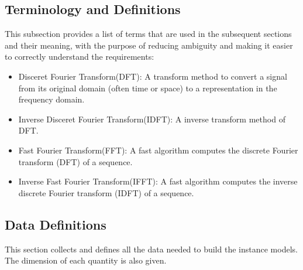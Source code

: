 \documentclass[12pt]{article}
\begin{document}
\subsection{Terminology and  Definitions}

This subsection provides a list of terms that are used in the subsequent
sections and their meaning, with the purpose of reducing ambiguity and making it
easier to correctly understand the requirements:

\begin{itemize}
\item Disceret  Fourier Transform(DFT):  A transform method to convert a signal from its original
  domain (often time or space) to a representation in the frequency domain.
\end{itemize}

\begin{itemize}
\item Inverse Disceret Fourier Transform(IDFT):  A inverse transform method of DFT. 
\end{itemize}

\begin{itemize}
\item Fast Fourier Transform(FFT): A fast algorithm computes the discrete Fourier transform (DFT) of a sequence.
\end{itemize}

\begin{itemize}
\item Inverse Fast Fourier Transform(IFFT): A fast algorithm computes the inverse discrete Fourier transform (IDFT) of a sequence.
\end{itemize}

\subsection{Data Definitions} \label{sec_datadef}

This section collects and defines all the data needed to build the instance
models. The dimension of each quantity is also given.  
~\newline
\end{document}
